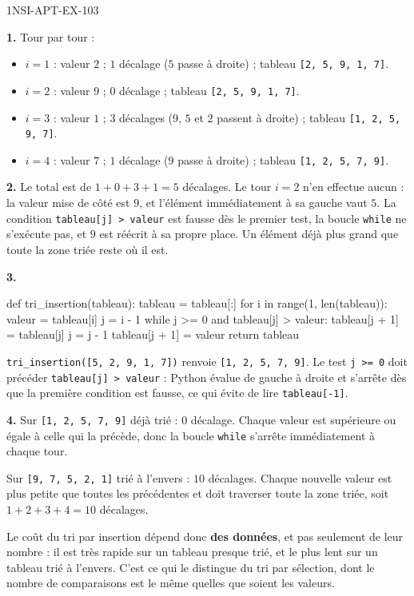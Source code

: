 \begin{corrige}{1NSI-APT-EX-103}

\textbf{1.} Tour par tour :

\begin{itemize}
  \item $i=1$ : valeur $2$ ; $1$ décalage ($5$ passe à droite) ; tableau
    \lstinline{[2, 5, 9, 1, 7]}.
  \item $i=2$ : valeur $9$ ; $0$ décalage ; tableau \lstinline{[2, 5, 9, 1, 7]}.
  \item $i=3$ : valeur $1$ ; $3$ décalages ($9$, $5$ et $2$ passent à droite) ; tableau
    \lstinline{[1, 2, 5, 9, 7]}.
  \item $i=4$ : valeur $7$ ; $1$ décalage ($9$ passe à droite) ; tableau
    \lstinline{[1, 2, 5, 7, 9]}.
\end{itemize}

\textbf{2.} Le total est de $1+0+3+1 = 5$ décalages. Le tour $i=2$ n'en effectue aucun :
la valeur mise de côté est $9$, et l'élément immédiatement à sa gauche vaut $5$. La
condition \lstinline{tableau[j] > valeur} est fausse dès le premier test, la boucle
\lstinline{while} ne s'exécute pas, et $9$ est réécrit à sa propre place. Un élément déjà
plus grand que toute la zone triée reste où il est.

\textbf{3.}
\begin{python}
def tri_insertion(tableau):
    tableau = tableau[:]
    for i in range(1, len(tableau)):
        valeur = tableau[i]
        j = i - 1
        while j >= 0 and tableau[j] > valeur:
            tableau[j + 1] = tableau[j]
            j = j - 1
        tableau[j + 1] = valeur
    return tableau
\end{python}
\lstinline{tri_insertion([5, 2, 9, 1, 7])} renvoie \lstinline{[1, 2, 5, 7, 9]}. Le test
\lstinline{j >= 0} doit précéder \lstinline{tableau[j] > valeur} : Python évalue de gauche
à droite et s'arrête dès que la première condition est fausse, ce qui évite de lire
\lstinline{tableau[-1]}.

\textbf{4.} Sur \lstinline{[1, 2, 5, 7, 9]} déjà trié : $0$ décalage. Chaque valeur est
supérieure ou égale à celle qui la précède, donc la boucle \lstinline{while} s'arrête
immédiatement à chaque tour.

Sur \lstinline{[9, 7, 5, 2, 1]} trié à l'envers : $10$ décalages. Chaque nouvelle valeur
est plus petite que toutes les précédentes et doit traverser toute la zone triée, soit
$1+2+3+4 = 10$ décalages.

Le coût du tri par insertion dépend donc \textbf{des données}, et pas seulement de leur
nombre : il est très rapide sur un tableau presque trié, et le plus lent sur un tableau
trié à l'envers. C'est ce qui le distingue du tri par sélection, dont le nombre de
comparaisons est le même quelles que soient les valeurs.

\end{corrige}
